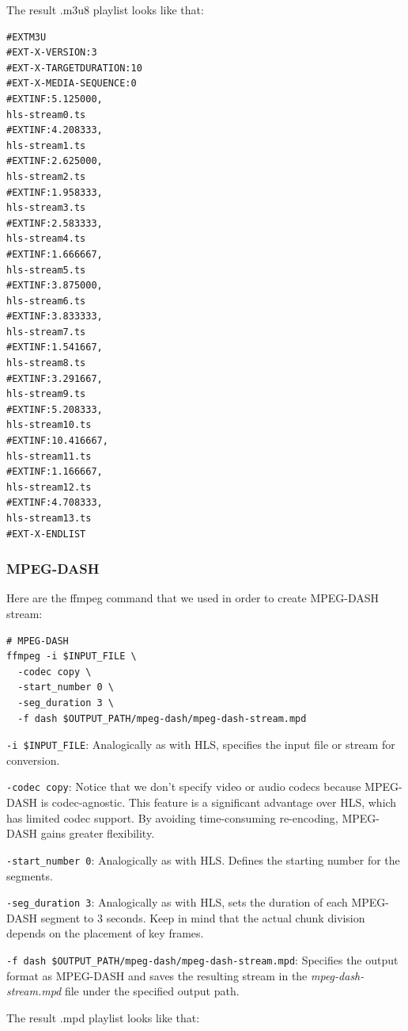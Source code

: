 \documentclass{article}
\begin{document}
The result .m3u8 playlist looks like that:

\begin{verbatim}
#EXTM3U
#EXT-X-VERSION:3
#EXT-X-TARGETDURATION:10
#EXT-X-MEDIA-SEQUENCE:0
#EXTINF:5.125000,
hls-stream0.ts
#EXTINF:4.208333,
hls-stream1.ts
#EXTINF:2.625000,
hls-stream2.ts
#EXTINF:1.958333,
hls-stream3.ts
#EXTINF:2.583333,
hls-stream4.ts
#EXTINF:1.666667,
hls-stream5.ts
#EXTINF:3.875000,
hls-stream6.ts
#EXTINF:3.833333,
hls-stream7.ts
#EXTINF:1.541667,
hls-stream8.ts
#EXTINF:3.291667,
hls-stream9.ts
#EXTINF:5.208333,
hls-stream10.ts
#EXTINF:10.416667,
hls-stream11.ts
#EXTINF:1.166667,
hls-stream12.ts
#EXTINF:4.708333,
hls-stream13.ts
#EXT-X-ENDLIST
\end{verbatim}

\subsubsection{MPEG-DASH}\label{mpeg-dash-1}

Here are the ffmpeg command that we used in order to create MPEG-DASH
stream:

\begin{verbatim}
# MPEG-DASH
ffmpeg -i $INPUT_FILE \
  -codec copy \
  -start_number 0 \
  -seg_duration 3 \
  -f dash $OUTPUT_PATH/mpeg-dash/mpeg-dash-stream.mpd
\end{verbatim}

\texttt{-i\ \$INPUT\_FILE}: Analogically as with HLS, specifies the
input file or stream for conversion.

\texttt{-codec\ copy}: Notice that we don't specify video or audio
codecs because MPEG-DASH is codec-agnostic. This feature is a
significant advantage over HLS, which has limited codec support. By
avoiding time-consuming re-encoding, MPEG-DASH gains greater
flexibility.

\texttt{-start\_number\ 0}: Analogically as with HLS. Defines the
starting number for the segments.

\texttt{-seg\_duration\ 3}: Analogically as with HLS, sets the duration
of each MPEG-DASH segment to 3 seconds. Keep in mind that the actual
chunk division depends on the placement of key frames.

\texttt{-f\ dash\ \$OUTPUT\_PATH/mpeg-dash/mpeg-dash-stream.mpd}:
Specifies the output format as MPEG-DASH and saves the resulting stream
in the \emph{mpeg-dash-stream.mpd} file under the specified output path.

The result .mpd playlist looks like that:
\end{document}
